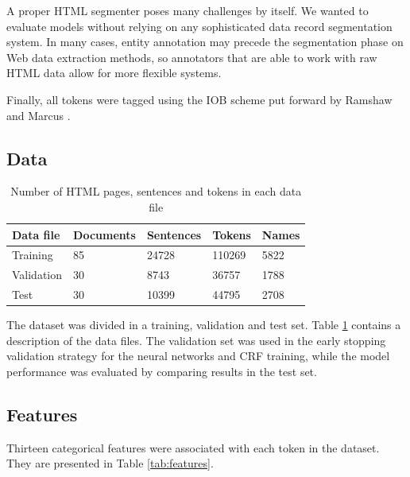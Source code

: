 \documentclass{nle}
\begin{document}
A proper HTML segmenter poses many challenges by itself. We wanted to evaluate 
models without relying on any sophisticated data record segmentation system.
In many cases, entity annotation may precede the segmentation
phase on Web data extraction methods, so annotators that are able to work 
with raw HTML data allow for more flexible systems. 

Finally, all tokens were tagged using the IOB scheme put forward by
Ramshaw and Marcus . 

\subsection{Data}

\begin{table}[h]
  \small
  \begin{center}
    \begin{tabular}{ lllll }
      \toprule
      Data file & Documents & Sentences & Tokens & Names \\
      \midrule
      Training    & 85 & 24728 & 110269 & 5822 \\  
      Validation  & 30 & 8743  & 36757  & 1788 \\
      Test        & 30 & 10399 & 44795  & 2708 \\
      \bottomrule
    \end{tabular}
  \end{center}
  \caption{Number of HTML pages, sentences and tokens in each data file}
  \label{tab:dataset}
\end{table}

The dataset was divided in a training, validation and test set. Table \ref{tab:dataset} contains
a description of the data files. The validation set was used in the early stopping validation strategy
for the neural networks and CRF training, while the model performance was evaluated by comparing 
results in the test set.

\subsection{Features}

Thirteen categorical features were associated with each token in the dataset. They 
are presented in Table \ref{tab:features}.
\end{document}

